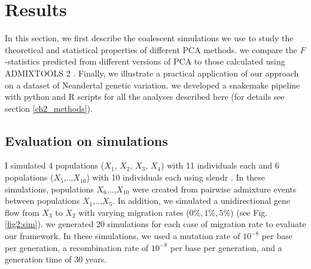 \documentclass[12pt]{article}
\begin{document}
\section{Results}
In this section, we first describe the coalescent simulations we use to study the theoretical and statistical properties of different PCA methods. we compare the $F$-statistics predicted from different versions of PCA to those calculated using ADMIXTOOLS 2 \citep{maier_limits_2022}. Finally, we illustrate a practical application of our approach on a dataset of Neandertal genetic variation. we developed a snakemake pipeline \citep{molder_sustainable_2021} with python and R scripts for all the analyses described here (for details see section \ref{ch2_methods}).

\subsection{Evaluation on simulations}
I simulated 4 populations ($X_1$, $X_2$, $X_3$, $X_4$) with 11 individuals each and 6 populations ($X_5$,..,$X_{10}$) with 10 individuals each using slendr \citep{petr_slendr_2022}. In these simulations, populations $X_6$,..,$X_{10}$ were created from pairwise admixture events between populations $X_1$,..,$X_5$. In addition, we simulated a unidirectional gene flow from $X_3$ to $X_2$ with varying migration rates ($0\%, 1\%, 5\%$) (see Fig. \ref{fig2:sim}). we generated 20 simulations for each case of migration rate to evaluate our framework.  In these simulations, we used a mutation rate of $10^{-8}$ per base per generation, a recombination rate of $10^{-8}$ per base per generation, and a generation time of 30 years. 
\end{document}
